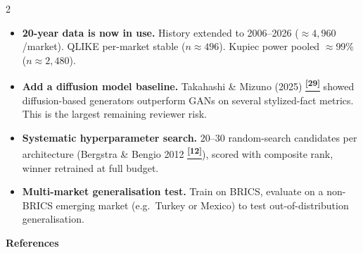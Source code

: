\documentclass[10pt]{article}
\newcommand{\amberbox}[2]{\begin{tcolorbox}[mybox={Amber}{ABg},title={#1}]#2\end{tcolorbox}}
\newcommand{\tcite}[1]{%
  \hyperlink{R:#1}{\textsuperscript{\scriptsize\textbf{[#1]}}}}
\begin{document}
\begin{multicols}{2}
\amberbox{Future Work}{%
\begin{itemize}
  \item \textbf{20-year data is now in use.} History extended to 2006--2026 ($\approx4{,}960$/market). QLIKE per-market stable ($n\approx496$). Kupiec power pooled $\approx$99\% ($n\approx2{,}480$).
  \item \textbf{Add a diffusion model baseline.} Takahashi \& Mizuno (2025)\tcite{29} showed diffusion-based generators outperform GANs on several stylized-fact metrics. This is the largest remaining reviewer risk.
  \item \textbf{Systematic hyperparameter search.} 20--30 random-search candidates per architecture (Bergstra \& Bengio 2012\tcite{12}), scored with composite rank, winner retrained at full budget.
  \item \textbf{Multi-market generalisation test.} Train on BRICS, evaluate on a non-BRICS emerging market (e.g.\ Turkey or Mexico) to test out-of-distribution generalisation.
\end{itemize}}

\end{multicols}

\clearpage

\begin{tcolorbox}[
  colback=NavyBg, colframe=NavyBg!60!black, arc=4pt,
  left=8pt, right=8pt, top=4pt, bottom=4pt,
  before skip=0pt, after skip=10pt]
{\large\bfseries\color{Navy} References}
\end{tcolorbox}
\end{document}

